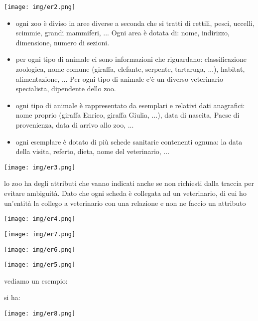 \documentclass[a4paper,12pt, oneside]{book}
\begin{document}
\begin{center}
\texttt{[image: img/er2.png]}
\end{center}
\begin{esempio}
\begin{itemize}
\item ogni zoo è diviso in aree diverse a seconda che si tratti di rettili, pesci, uccelli, scimmie, grandi mammiferi, ... Ogni area è dotata di: nome,
indirizzo, dimensione, numero di sezioni.
\item per ogni tipo di animale ci sono informazioni che riguardano: classificazione zoologica, nome comune (giraffa, elefante, serpente,
tartaruga, ...), habitat, alimentazione, ... Per ogni tipo di animale c'è un diverso veterinario specialista, dipendente dello zoo.
\item ogni tipo di animale è rappresentato da esemplari e relativi dati anagrafici: nome proprio (giraffa Enrico, giraffa Giulia, ...), data di nascita,
Paese di provenienza, data di arrivo allo zoo, ...
\item ogni esemplare è dotato di più schede sanitarie contenenti ognuna: la data della visita, referto, dieta, nome del veterinario, ...

\end{itemize}
\begin{center}
\texttt{[image: img/er3.png]}
\end{center}
lo zoo ha degli attributi che vanno indicati anche se non richiesti dalla traccia per evitare ambiguità. Dato che ogni scheda è collegata ad un veterinario, di cui ho un'entità la collego a veterinario con una relazione e non ne faccio  un attributo
\end{esempio}
\begin{center}
\texttt{[image: img/er4.png]}
\end{center}
\begin{center}
\texttt{[image: img/er7.png]}
\end{center}
\begin{center}
\texttt{[image: img/er6.png]}
\end{center}
\begin{center}
\texttt{[image: img/er5.png]}
\end{center}
vediamo un esempio:
\begin{esempio}
si ha:
\begin{center}
\texttt{[image: img/er8.png]}
\end{center}

\end{esempio}
\end{document}
